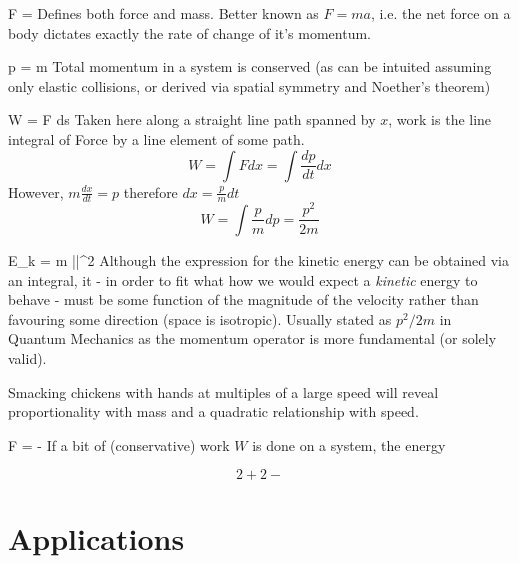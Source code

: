 \begin{multicols}{2}
	\begin{test}{F = }
		Defines both force and mass. Better known as $F = ma$, i.e. the net force on a body dictates exactly the rate of change of it's momentum.
	\end{test}
	
	\begin{test}[Momentum]{p = m}
		Total momentum in a system is conserved (as can be intuited assuming only elastic collisions, or derived via spatial symmetry and Noether's theorem)
	\end{test}
	\begin{test}[Work]{\displaystyle W = \int F ds}
		Taken here along a straight line path spanned by $x$, work is the line integral of Force by a line element of some path.
		\begin{equation*}
			W = \int F dx = \int \frac{dp}{dt} dx
		\end{equation*}
		However, $m \frac{dx}{dt} = p$ therefore $dx = \frac{p}{m} dt$ 
		\begin{equation*}
			W = \int \frac{p}{m} dp = \frac{p^2}{2m}
		\end{equation*}
	\end{test}
	\begin{test}{E_k =  m ||^2}
		Although the expression for the kinetic energy can be obtained via an integral, it - in order to fit what how we would expect a \textit{kinetic} energy to behave - must be some function of the magnitude of the velocity rather than favouring some direction (space is isotropic). Usually stated as $p^2 / 2m$ in Quantum Mechanics as the momentum operator is more fundamental (or solely valid).
		    
		Smacking chickens with hands at multiples of a large speed will reveal proportionality with mass and a quadratic relationship with speed.
	\end{test}
	\begin{test}[Potential]{F = -}
		If a bit of (conservative) work $W$ is done on a system, the energy 
		
		\begin{equation*}
		    2 + 2 - 
		\end{equation*}
	\end{test}
\end{multicols}
\newpage
\section{Applications}
